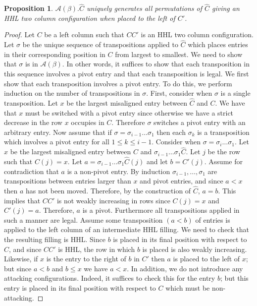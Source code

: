 \documentclass[11pt]{amsart}
\newtheorem{prop}{Proposition}[section]
\begin{document}
{\begin{prop}
$\mathcal{A}(\beta).\widehat{C}$ uniquely generates all permutations of $\widehat{C}$ giving an HHL two column configuration when placed to the left of $C'$. 
\end{prop}
\begin{proof}
Let $C$ be a left column such that $CC'$ is an HHL two column configuration. Let $\sigma$ be the unique sequence of transpositions applied to $\widehat{C}$ which places entries in their corresponding position in $C$ from largest to smallest. We need to show that $\sigma$ is in $\mathcal{A}(\beta)$. In other words, it suffices to show that each transposition in this sequence involves a pivot entry and that each transposition is legal. 
\newline\indent We first show that each transposition involves a pivot entry. To do this, we perform induction on the number of transpositions in $\sigma$. First, consider when $\sigma$ is a single transposition. Let $x$ be the largest misaligned entry between $\widehat{C}$ and $C$. We have that $x$ must be switched with a pivot entry since otherwise we have a strict decrease in the row $x$ occupies in $C$. Therefore $\sigma$ switches a pivot entry with an arbitrary entry. Now assume that if $\sigma=\sigma_{i-1}\ldots\sigma_{1}$ then each $\sigma_{k}$ is a transposition which involves a pivot entry for all $1\leq k\leq i-1$. Consider when $\sigma=\sigma_{i}\ldots\sigma_{1}$. Let $x$ be the largest misaligned entry between $C$ and $\sigma_{i-1}\ldots\sigma_{1}\widehat{C}$. Let $j$ be the row such that $C(j)=x$. Let $a=\sigma_{i-1}\ldots\sigma_{1}\widehat{C}(j)$ and let $b=C'(j)$. Assume for contradiction that $a$ is a non-pivot entry. By induction $\sigma_{i-1},\ldots,\sigma_{1}$ are transpositions between entries larger than $x$ and pivot entries, and since $a<x$ then $a$ has not been moved. Therefore, by the construction of $\widehat{C}$, $a=b$. This implies that $CC'$ is not weakly increasing in rows since $C(j)=x$ and $C'(j)=a$. Therefore, $a$ is a pivot. 
\newline\indent Furthermore all transpositions applied in such a manner are legal. Assume some transposition $(a<b)$ of entries is applied to the left column of an intermediate HHL filling. We need to check that the resulting filling is HHL. Since $b$ is placed in its final position with respect to $C$, and since $CC'$ is HHL, the row in which $b$ is placed is also weakly increasing. Likewise, if $x$ is the entry to the right of $b$ in $C'$ then $a$ is placed to the left of $x$; but since $a<b$ and $b\leq x$ we have $a<x$. In addition, we do not introduce any attacking configurations. Indeed, it suffices to check this for the entry $b$; but this entry is placed in its final position with respect to $C$ which must be non-attacking. 

\end{proof}}
\end{document}
